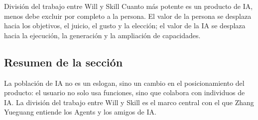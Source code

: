 \begin{importantbox}{División del trabajo entre Will y Skill}
Cuanto más potente es un producto de IA, menos debe excluir por completo a la persona. El valor de la persona se desplaza hacia los objetivos, el juicio, el gusto y la elección; el valor de la IA se desplaza hacia la ejecución, la generación y la ampliación de capacidades.
\end{importantbox}

\subsection{Resumen de la sección}

La población de IA no es un eslogan, sino un cambio en el posicionamiento del producto: el usuario no solo usa funciones, sino que colabora con individuos de IA. La división del trabajo entre Will y Skill es el marco central con el que Zhang Yueguang entiende los Agents y los amigos de IA.
